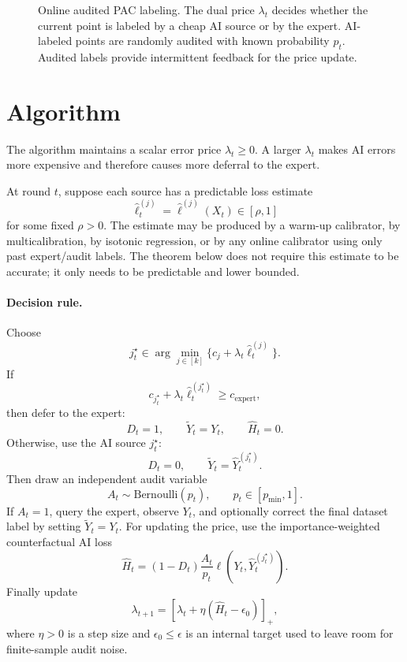 \documentclass[11pt]{article}
\newcommand{\1}{\mathbf{1}}
\newcommand{\Yhat}{\widehat Y}
\newcommand{\ellhat}{\widehat\ell}
\newcommand{\Hhat}{\widehat H}
\begin{document}
\begin{figure}[t]
{%
}
\caption{Online audited PAC labeling. The dual price $\lambda_t$ decides whether the current point is labeled by a cheap AI source or by the expert. AI-labeled points are randomly audited with known probability $p_t$. Audited labels provide intermittent feedback for the price update.}
\label{fig:setup}
\end{figure}

\section{Algorithm}

The algorithm maintains a scalar error price $\lambda_t\ge 0$. A larger $\lambda_t$ makes AI errors more expensive and therefore causes more deferral to the expert.

At round $t$, suppose each source has a predictable loss estimate
\[
\ellhat_t^{(j)}=\ellhat^{(j)}(X_t)\in[\rho,1]
\]
for some fixed $\rho>0$. The estimate may be produced by a warm-up calibrator, by multicalibration, by isotonic regression, or by any online calibrator using only past expert/audit labels. The theorem below does not require this estimate to be accurate; it only needs to be predictable and lower bounded.

\paragraph{Decision rule.}
Choose
\[
j_t^\star\in\arg\min_{j\in[k]}\{c_j+\lambda_t\ellhat_t^{(j)}\}.
\]
If
\[
c_{j_t^\star}+\lambda_t\ellhat_t^{(j_t^\star)}\ge c_{\mathrm{expert}},
\]
then defer to the expert:
\[
D_t=1,\qquad \widetilde Y_t=Y_t,\qquad \Hhat_t=0.
\]
Otherwise, use the AI source $j_t^\star$:
\[
D_t=0,\qquad \widetilde Y_t=\Yhat_t^{(j_t^\star)}.
\]
Then draw an independent audit variable
\[
A_t\sim \mathrm{Bernoulli}(p_t),\qquad p_t\in[p_{\min},1].
\]
If $A_t=1$, query the expert, observe $Y_t$, and optionally correct the final dataset label by setting $\widetilde Y_t=Y_t$. For updating the price, use the importance-weighted counterfactual AI loss
\[
\Hhat_t=(1-D_t)\frac{A_t}{p_t}\ell(Y_t,\Yhat_t^{(j_t^\star)}).
\]
Finally update
\begin{equation}
\lambda_{t+1}=\left[\lambda_t+\eta(\Hhat_t-\epsilon_0)\right]_+,
\label{eq:update}
\end{equation}
where $\eta>0$ is a step size and $\epsilon_0\le \epsilon$ is an internal target used to leave room for finite-sample audit noise.
\end{document}

